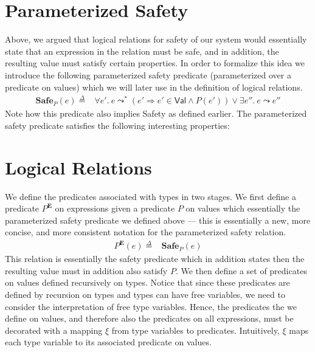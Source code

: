 \documentclass{article}
\newcommand{\VAL}{\mathsf{Val}}
\newcommand{\defeq}{\overset{\Delta}{=}}
\newcommand{\pred}{P}
\newcommand{\semErel}[1]{#1^{\textbf{E}}}
\newcommand{\semenv}{\xi}
\newcommand{\expr}{e}
\newcommand{\step}{\leadsto}
\newcommand{\steps}{\leadsto^*}
\newcommand{\Safe}[1]{\textbf{Safe}_{#1}}
\begin{document}
\section{Parameterized Safety}
\label{sec:safety}

Above, we argued that logical relations for safety of our system would essentially state that an expression in the relation must be safe, and in addition, the resulting value must satisfy certain properties.
In order to formalize this idea we introduce the following parameterized safety predicate (parameterized over a predicate on values) which we will later use in the definition of logical relations.
\begin{align*}
  \Safe{\pred}(\expr) \defeq{}& \forall \expr'.~ \expr \steps (\expr' \Rightarrow \expr' \in \VAL \land P(\expr')) \lor \exists \expr''.~\expr \step \expr''
\end{align*}
Note how this predicate also implies Safety as defined earlier.
The parameterized safety predicate satisfies the following interesting properties:

\section{Logical Relations}
We define the predicates associated with types in two stages.
We first define a predicate $\semErel{\pred}$ on expressions given a predicate $\pred$ on values which essentially the parameterized safety predicate we defined above --- this is essentially a new, more concise, and more consistent notation for the parameterized safety relation.
\begin{align*}
  \semErel{\pred}(\expr) \defeq{}& \Safe{\pred}(\expr)
\end{align*}
This relation is essentially the safety predicate which in addition states then the resulting value must in addition also satisfy $\pred$.
We then define a set of predicates on values defined recursively on types.
Notice that since these predicates are defined by recursion on types and types can have free variables, we need to consider the interpretation of free type variables.
Hence, the predicates the we define on values, and therefore also the predicates on all expressions, must be decorated with a mapping $\semenv$ from type variables to predicates.
Intuitively, $\semenv$ maps each type variable to its associated predicate on values.
\end{document}

